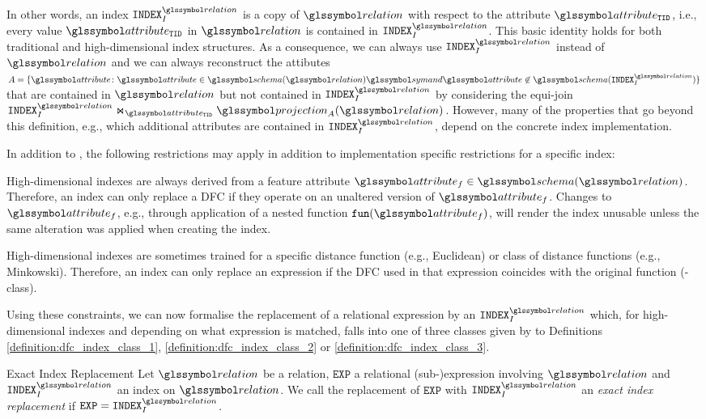 In other words, an index $\mathtt{INDEX}^{\relation}_{I}$ is a copy of $\relation$ with respect to the attribute $\attribute_{\mathtt{TID}}$, i.e., every value $\attribute_{\mathtt{TID}}$ in $\relation$ is contained in $\mathtt{INDEX}^{\relation}_{I}$. This basic identity holds for both traditional and high-dimensional index structures. As a consequence, we can always use $\mathtt{INDEX}^{\relation}_{I}$ instead of $\relation$ and we can always reconstruct the attibutes $A = \{ \attribute \colon \attribute \in \schema(\relation) \symand \attribute \not\in \schema(\mathtt{INDEX}^{\relation}_{I}) \}$ that are contained in $\relation$ but not contained in $\mathtt{INDEX}^{\relation}_{I}$ by considering the equi-join $\mathtt{INDEX}^{\relation}_{I} \Join_{\attribute_{\mathtt{TID}}} \projection_{A}(\relation)$. However, many of the properties that go beyond this definition, e.g., which additional attributes are contained in $\mathtt{INDEX}^{\relation}_{I}$, depend on the concrete index implementation.

In addition to , the following restrictions may apply in addition to implementation specific restrictions for a specific index:
\begin{enumerate*}[label=(\roman*)]
    \item High-dimensional indexes are always derived from a feature attribute $\attribute_f \in \schema(\relation)$. Therefore, an index can only replace a DFC if they operate on an unaltered version of $\attribute_f$. Changes to $\attribute_f$, e.g., through application of a nested function $\mathtt{fun}(\attribute_f)$, will render the index unusable unless the same alteration was applied when creating the index.
    \item High-dimensional indexes are sometimes trained for a specific distance function (e.g., Euclidean) or class of distance functions (e.g., Minkowski). Therefore, an index can only replace an expression if the DFC used in that expression coincides with the original function (-class).
\end{enumerate*} Using these constraints, we can now formalise the replacement of a relational expression by an $\mathtt{INDEX}^{\relation}_{I}$ which, for high-dimensional indexes and depending on what expression is matched, falls into one of three classes given by to Definitions \ref{definition:dfc_index_class_1}, \ref{definition:dfc_index_class_2} or \ref{definition:dfc_index_class_3}.

\begin{definition}[label=definition:definition:index_replacement_exact]{Exact Index Replacement}{}
    Let $\relation$ be a relation, $\mathtt{EXP}$ a relational (sub-)expression involving $\relation$ and $\mathtt{INDEX}^{\relation}_{I}$ an index on $\relation$. We call the replacement of $\mathtt{EXP}$ with $\mathtt{INDEX}^{\relation}_{I}$ an \emph{exact index replacement} if $\mathtt{EXP} = \mathtt{INDEX}^{\relation}_{I}$.
\end{definition}

